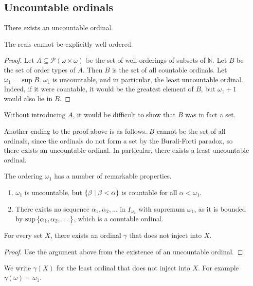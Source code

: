 \subsection{Uncountable ordinals}
\begin{theorem}
    There exists an uncountable ordinal.
\end{theorem}
\begin{remark}
    The reals cannot be explicitly well-ordered.
\end{remark}
\begin{proof}
    Let \( A \subseteq \mathcal P (\omega \times \omega) \) be the set of well-orderings of subsets of \( \mathbb N \).
    Let \( B \) be the set of order types of \( A \).
    Then \( B \) is the set of all countable ordinals.
    Let \( \omega_1 = \sup B \).
    \( \omega_1 \) is uncountable, and in particular, the least uncountable ordinal.
    Indeed, if it were countable, it would be the greatest element of \( B \), but \( \omega_1 + 1 \) would also lie in \( B \).
\end{proof}
\begin{remark}
    Without introducing \( A \), it would be difficult to show that \( B \) was in fact a set.
\end{remark}
\begin{remark}
    Another ending to the proof above is as follows.
    \( B \) cannot be the set of all ordinals, since the ordinals do not form a set by the Burali-Forti paradox, so there exists an uncountable ordinal.
    In particular, there exists a least uncountable ordinal.
\end{remark}
The ordering \( \omega_1 \) has a number of remarkable properties.
\begin{enumerate}
    \item \( \omega_1 \) is uncountable, but \( \qty{\beta \mid \beta < \alpha} \) is countable for all \( \alpha < \omega_1 \).
    \item There exists no sequence \( \alpha_1, \alpha_2, \dots \) in \( I_{\omega_1} \) with supremum \( \omega_1 \), as it is bounded by \( \sup\qty{\alpha_1, \alpha_2, \dots} \), which is a countable ordinal.
\end{enumerate}
\begin{theorem}
    For every set \( X \), there exists an ordinal \( \gamma \) that does not inject into \( X \).
\end{theorem}
\begin{proof}
    Use the argument above from the existence of an uncountable ordinal.
\end{proof}
We write \( \gamma(X) \) for the least ordinal that does not inject into \( X \).
For example \( \gamma(\omega) = \omega_1 \).

